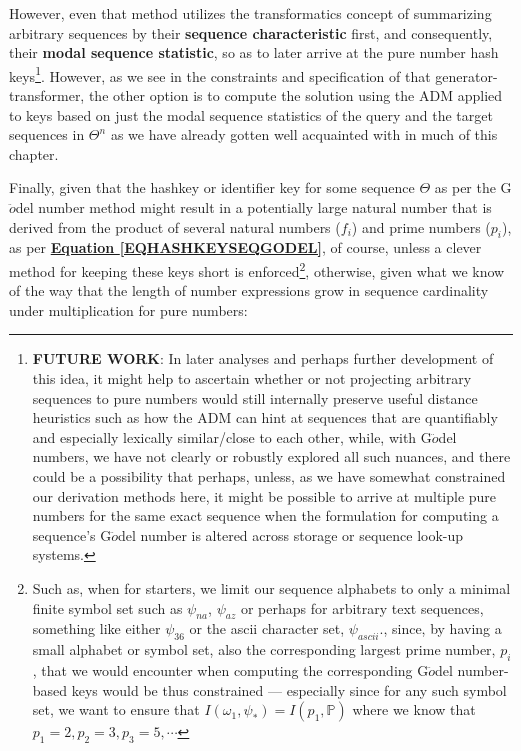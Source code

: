 \documentclass[a4paper, 18pt]{book} %
\begin{document}
 
   However, even that method utilizes the transformatics concept of summarizing arbitrary sequences by their \textbf{sequence characteristic} first, and consequently, their \textbf{modal sequence statistic}, so as to later arrive at the pure number hash keys\footnote{\textbf{FUTURE WORK}: In later analyses and perhaps further development of this idea, it might help to ascertain whether or not projecting arbitrary sequences to pure numbers would still internally preserve useful distance heuristics such as how the ADM can hint at sequences that are quantifiably and especially lexically similar/close to each other, while, with G$\ddot{o}$del numbers, we have not clearly or robustly explored all such nuances, and there could be a possibility that perhaps, unless, as we have somewhat constrained our derivation methods here, it might be possible to arrive at multiple pure numbers for the same exact sequence when the formulation for computing a sequence's  G$\ddot{o}$del number is altered across storage or sequence look-up systems.}. However, as we see in the constraints and specification of that generator-transformer, the other option is to compute the solution using the ADM applied to keys based on just the modal sequence statistics of the query and the target sequences in $\Theta^n$ as we have already gotten well acquainted with in much of this chapter.
   
   Finally, given that the hashkey or identifier key for some sequence $\Theta$ as per the G$\ddot{o}$del number method might result in a potentially large natural number that is derived from the product of several natural numbers ($f_i$) and prime numbers ($p_i$), as per \textbf{\hyperref[EQHASHKEYSEQGODEL]{Equation \ref{EQHASHKEYSEQGODEL}}}, of course, unless a clever method for keeping these keys short is enforced\footnote{Such as, when for starters, we limit our sequence alphabets to only a minimal finite symbol set such as $\psi_{na}$, $\psi_{az}$ or perhaps for arbitrary text sequences, something like either $\psi_{36}$ or the ascii character set, $\psi_{ascii}$., since, by having a small alphabet or symbol set, also the corresponding largest prime number, $p_i$, that we would encounter when computing the corresponding G$\ddot{o}$del number-based keys would be thus constrained --- especially since for any such symbol set, we want to ensure that $I(\omega_1,\psi_*) = I(p_1,\mathbb{P})$ where we know that $p_1 = 2, p_2 = 3, p_3= 5, \cdots$}, otherwise, given what we know of the way that the length of number expressions grow in sequence cardinality under multiplication for pure numbers\cite{Lutalo2024gtnc}:
   
\end{document}
